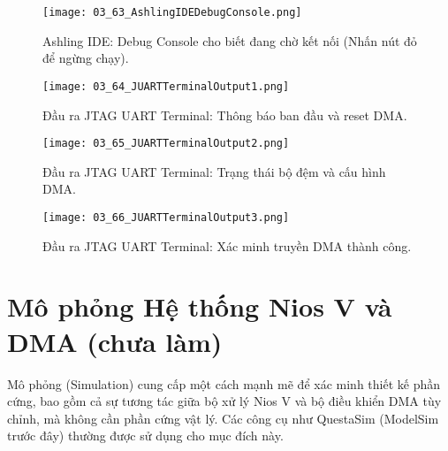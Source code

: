 \begin{figure}[htbp] \centering \texttt{[image: 03\_63\_AshlingIDEDebugConsole.png]} \caption{Ashling IDE: Debug Console cho biết đang chờ kết nối (Nhấn nút đỏ để ngừng chạy).} \label{fig:03_63} \end{figure}
\begin{figure}[htbp] \centering \texttt{[image: 03\_64\_JUARTTerminalOutput1.png]} \caption{Đầu ra JTAG UART Terminal: Thông báo ban đầu và reset DMA.} \label{fig:03_64} \end{figure}
\begin{figure}[htbp] \centering \texttt{[image: 03\_65\_JUARTTerminalOutput2.png]} \caption{Đầu ra JTAG UART Terminal: Trạng thái bộ đệm và cấu hình DMA.} \label{fig:03_65} \end{figure}
\begin{figure}[htbp] \centering \texttt{[image: 03\_66\_JUARTTerminalOutput3.png]} \caption{Đầu ra JTAG UART Terminal: Xác minh truyền DMA thành công.} \label{fig:03_66} \end{figure}




\FloatBarrier

\section{Mô phỏng Hệ thống Nios V và DMA (chưa làm)}
\label{sec:simulation_future}

Mô phỏng (Simulation) cung cấp một cách mạnh mẽ để xác minh thiết kế phần cứng, bao gồm cả sự tương tác giữa bộ xử lý Nios V và bộ điều khiển DMA tùy chỉnh, mà không cần phần cứng vật lý. Các công cụ như QuestaSim (ModelSim trước đây) thường được sử dụng cho mục đích này.


